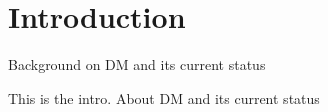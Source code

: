 \graphicspath{{img/chapter_1/}}

\chapter{Introduction}
\label{chapter:introduction}

\begin{synopsis}
    Background on DM and its current status
  \end{synopsis}

  This is the intro. About DM and its current status